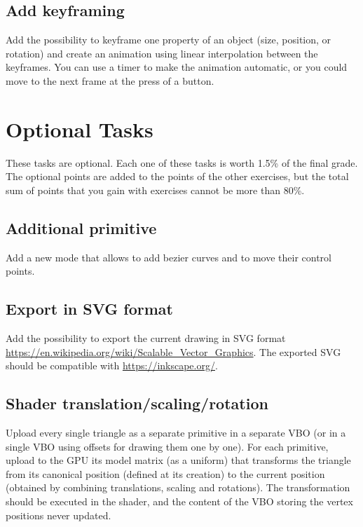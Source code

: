 \documentclass[11pt]{article}
\begin{document}
\subsection{Add keyframing}

Add the possibility to keyframe one property of an object (size,  position, or rotation) and create an animation using linear interpolation between the keyframes. You can use a timer to make the animation automatic, or you could move to the next frame at the press of a button.

\section*{Optional Tasks}

These tasks are optional. Each one of these tasks is worth 1.5\% of the final grade. The optional points are added to the points of the other exercises, but the total sum of points that you gain with exercises cannot be more than 80\%.

\subsection{Additional primitive}

Add a new mode that allows to add bezier curves and to move their control points.

\subsection{Export in SVG format}

Add the possibility to export the current drawing in SVG format \url{https://en.wikipedia.org/wiki/Scalable_Vector_Graphics}. The exported SVG should be compatible with \url{https://inkscape.org/}.

\subsection{Shader translation/scaling/rotation}
\label{sec:shader}
Upload every single triangle as a separate primitive in a separate VBO (or in a single VBO using offsets for drawing them one by one). For each primitive, upload to the GPU its model matrix (as a uniform) that transforms the triangle from its canonical position (defined at its creation) to the current position (obtained by combining translations, scaling and rotations). The transformation should be executed in the shader, and the content of the VBO storing the vertex positions never updated.

%
%
\end{document}
